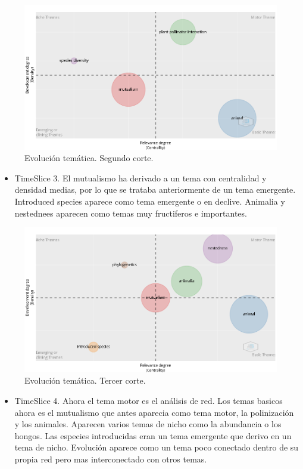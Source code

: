 \documentclass[
]{article}
\providecommand{\tightlist}{%
  \setlength{\itemsep}{0pt}\setlength{\parskip}{0pt}}
\begin{document}
\begin{figure}
\centering
\includegraphics{ThematicEvolutionSlice2.png}
\caption{Evolución temática. Segundo corte.}
\end{figure}

\begin{itemize}
\tightlist
\item
  TimeSlice 3. El mutualismo ha derivado a un tema con centralidad y
  densidad medias, por lo que se trataba anteriormente de un tema
  emergente. Introduced species aparece como tema emergente o en
  declive. Animalia y nestednees aparecen como temas muy fructiferos e
  importantes.
\end{itemize}

\begin{figure}
\centering
\includegraphics{ThematicEvolutionSlice3.png}
\caption{Evolución temática. Tercer corte.}
\end{figure}

\begin{itemize}
\tightlist
\item
  TimeSlice 4. Ahora el tema motor es el análisis de red. Los temas
  basicos ahora es el mutualismo que antes aparecia como tema motor, la
  polinización y los animales. Aparecen varios temas de nicho como la
  abundancia o los hongos. Las especies introducidas eran un tema
  emergente que derivo en un tema de nicho. Evolución aparece como un
  tema poco conectado dentro de su propia red pero mas interconectado
  con otros temas.
\end{itemize}
\end{document}
